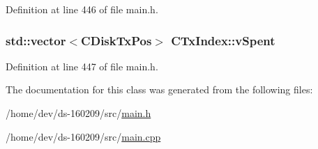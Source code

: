 Definition at line 446 of file main.\+h.

\hypertarget{class_c_tx_index_a88317d56c02acd1faec4863bcb293d2c}{}
\subsubsection[{v\+Spent}]{\setlength{\rightskip}{0pt plus 5cm}std\+::vector$<${\bf C\+Disk\+Tx\+Pos}$>$ C\+Tx\+Index\+::v\+Spent}\label{class_c_tx_index_a88317d56c02acd1faec4863bcb293d2c}


Definition at line 447 of file main.\+h.



The documentation for this class was generated from the following files\+:\begin{DoxyCompactItemize}
\item 
/home/dev/ds-\/160209/src/\hyperlink{main_8h}{main.\+h}\item 
/home/dev/ds-\/160209/src/\hyperlink{main_8cpp}{main.\+cpp}\end{DoxyCompactItemize}
